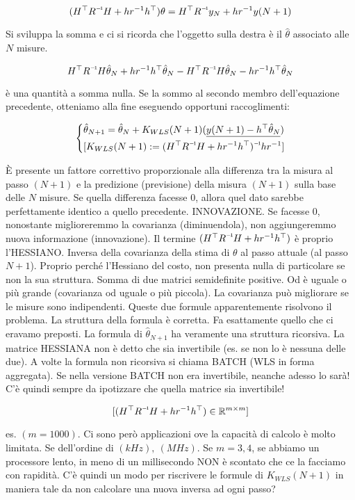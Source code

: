\[
	(H^\top\inv{R}H+hr^{-1}h^\top)\theta = H^\top\inv{R}y_N + hr^{-1}y(N+1)
\]

Si sviluppa la somma e ci si ricorda che l'oggetto sulla destra è il $\hat{\theta}$ associato alle $N$ misure.

\[
	H^\top\inv{R}H\hat{\theta}_N + hr^{-1}h^\top\hat{\theta}_N - H^\top\inv{R}H\hat{\theta}_N -hr^{-1}h^\top\hat{\theta}_N
\]

è una quantità a somma nulla. Se la sommo al secondo membro dell'equazione precedente, otteniamo alla fine eseguendo opportuni raccoglimenti:

\[
	\left\{
	\begin{aligned}
	&\hat{\theta}_{N+1} = \hat{\theta}_N + K_{WLS}(N+1)(\underline{y(N+1)-h^\top\hat{\theta}_N})\\
	&[K_{WLS}(N+1) := \inv{(H^\top\inv{R}H + hr^{-1}h^\top)}hr^{-1}]
	\end{aligned}
	\right.
\]

\`E presente un fattore correttivo proporzionale alla differenza tra la misura al passo $(N+1)$ e la predizione (previsione) della misura $(N+1)$ sulla base delle $N$ misure. Se quella differenza facesse 0, allora quel dato sarebbe perfettamente identico a quello precedente. INNOVAZIONE. Se facesse 0, nonostante miglioreremmo la covarianza (diminuendola), non aggiungeremmo nuova informazione (innovazione). Il termine $(H^\top\inv{R}H+hr^{-1}h^\top)$ è proprio l'HESSIANO. Inversa della covarianza della stima di $\theta$ al passo attuale (al passo $N+1$). Proprio perché  l'Hessiano del costo, non presenta nulla di particolare se non la sua struttura. Somma di due matrici semidefinite positive. Od è uguale o più grande (covarianza od uguale o più piccola). La covarianza può migliorare se le misure sono indipendenti. Queste due formule apparentemente risolvono il problema. La struttura della formula è corretta. Fa esattamente quello che ci eravamo preposti. La formula di $\hat{\theta}_{N+1}$ ha veramente una struttura ricorsiva. La matrice HESSIANA non è detto che sia invertibile (es. se non lo è nessuna delle due). A volte la formula non ricorsiva si chiama BATCH (WLS in forma aggregata). Se nella versione BATCH non era invertibile, neanche adesso lo sarà! C'è quindi sempre da ipotizzare che quella matrice sia invertibile! 

\[
	[(H^\top\inv{R}H+hr^{-1}h^\top)\in\R^{m\times m}]
\]

es. $(m=1000)$. Ci sono però applicazioni ove la capacità di calcolo è molto limitata. Se dell'ordine di $(kHz),\ (MHz)$. Se $m=3,4$, se abbiamo un processore lento, in meno di un millisecondo NON è scontato che ce la facciamo con rapidità. C'è quindi un modo per riscrivere le formule di $K_{WLS}(N+1)$ in maniera tale da non calcolare una nuova inversa ad ogni passo?

